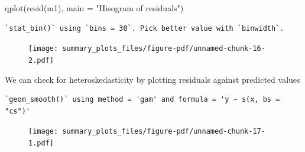 \documentclass[
  letterpaper,
  DIV=11,
  numbers=noendperiod]{scrreprt}
\newenvironment{Shaded}{\begin{snugshade}}{\end{snugshade}}
\newcommand{\AttributeTok}[1]{\textcolor[rgb]{0.49,0.56,0.16}{#1}}
\newcommand{\FloatTok}[1]{\textcolor[rgb]{0.25,0.63,0.44}{#1}}
\newcommand{\FunctionTok}[1]{\textcolor[rgb]{0.02,0.16,0.49}{#1}}
\newcommand{\NormalTok}[1]{\textcolor[rgb]{0.00,0.44,0.13}{#1}}
\newcommand{\OtherTok}[1]{\textcolor[rgb]{0.00,0.44,0.13}{#1}}
\newcommand{\SpecialCharTok}[1]{\textcolor[rgb]{0.25,0.44,0.63}{#1}}
\newcommand{\StringTok}[1]{\textcolor[rgb]{0.25,0.44,0.63}{#1}}
\begin{document}
\begin{Shaded}
\begin{Highlighting}[]
  \FunctionTok{qplot}\NormalTok{(}\FunctionTok{resid}\NormalTok{(m1), }
       \AttributeTok{main =} \StringTok{"Hisogram of residuals"}\NormalTok{)}
\end{Highlighting}
\end{Shaded}

\begin{verbatim}
`stat_bin()` using `bins = 30`. Pick better value with `binwidth`.
\end{verbatim}

\begin{figure}[H]

{\centering \texttt{[image: summary\_plots\_files/figure-pdf/unnamed-chunk-16-2.pdf]}

}

\end{figure}

We can check for heteroskedasticity by plotting residuals against
predicted values

\begin{Shaded}
\end{Shaded}

\begin{verbatim}
`geom_smooth()` using method = 'gam' and formula = 'y ~ s(x, bs = "cs")'
\end{verbatim}

\begin{figure}[H]

{\centering \texttt{[image: summary\_plots\_files/figure-pdf/unnamed-chunk-17-1.pdf]}

}

\end{figure}
\end{document}
